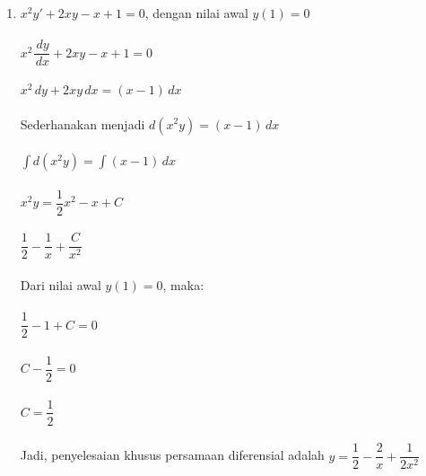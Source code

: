 \begin{enumerate}[1.]
	\item \begin{math} x^{2}y' + 2xy - x + 1 = 0 \end{math}, dengan nilai awal \begin{math} y(1) = 0 \end{math} \\ \\
	\begin{math} x^{2} \dfrac{\, dy}{\, dx} + 2xy - x + 1 = 0 \end{math} \\ \\	
	\begin{math} x^{2} \, dy + 2xy \, dx = (x - 1) \, dx \end{math} \\ \\
	Sederhanakan menjadi \begin{math} d(x^{2}y) = (x -1) \, dx \end{math} \\ \\
	\begin{math} \int d(x^{2}y) = \int (x - 1) \, dx \end{math} \\ \\
	\begin{math} x^{2}y = \dfrac{1}{2}x^{2} - x + C \end{math}  \\ \\
	\begin{math} \dfrac{1}{2} - \dfrac{1}{x} + \dfrac{C}{x^{2}} \end{math} \\ \\
	Dari nilai awal \begin{math} y(1) = 0 \end{math}, maka: \\ \\
	\begin{math}  \dfrac{1}{2} - 1 + C = 0 \end{math} \\ \\
	\begin{math} C - \dfrac{1}{2} = 0 \end{math} \\ \\
	\begin{math} C = \dfrac{1}{2} \end{math} \\ \\
	Jadi, penyelesaian khusus persamaan diferensial adalah \begin{math} y = \dfrac{1}{2} - \dfrac{2}{x} + \dfrac{1}{2x^{2}} \end{math}

\end{enumerate}

